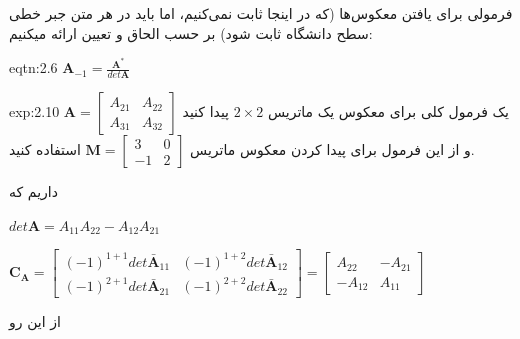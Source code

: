 {\begin{spacing}{1.5}
        فرمولی برای یافتن معکوس‌ها (که در اینجا ثابت نمی‌کنیم، اما باید در هر متن جبر خطی سطح دانشگاه ثابت شود) بر حسب الحاق و تعیین ارائه میکنیم:

        \begin{eqtn}{eqtn:2.6}
            \centering
            $\textbf{A}_{-1}=\frac{\displaystyle\textbf{A}^{*}}{\displaystyle det\textbf{A}}$
        \end{eqtn}

        \begin{example}{exp:2.10}
            \Large
            یک فرمول کلی برای معکوس یک ماتریس $2\times 2$ پیدا کنید $\textbf{A}=\begin{bmatrix}
                                                                                    A_{21} & A_{22} \\
                                                                                    A_{31} & A_{32}
            \end{bmatrix}$ و از این فرمول برای پیدا کردن معکوس ماتریس $\textbf{M}=\begin{bmatrix}
                                                                                      3  & 0 \\
                                                                                      -1 & 2
            \end{bmatrix}$ استفاده کنید.

            داریم که

            $det \textbf{A}=A_{11}A_{22}-A_{12}A_{21}$

            \begin{center}
                $\textbf{C}_{\textbf{A}}=\begin{bmatrix}
                (-1)
                                             ^{1+1}det\bar{\textbf{A}}_{11}     & (-1)^{1+2}det\bar{\textbf{A}}_{12} \\
                                             (-1)^{2+1}det\bar{\textbf{A}}_{21} & (-1)^{2+2}det\bar{\textbf{A}}_{22}
                \end{bmatrix}=\begin{bmatrix}
                                  A_{22}  & -A_{21} \\
                                  -A_{12} & A_{11}
                \end{bmatrix}$
            \end{center}

            از این رو


\end{example}
\end{spacing}}

